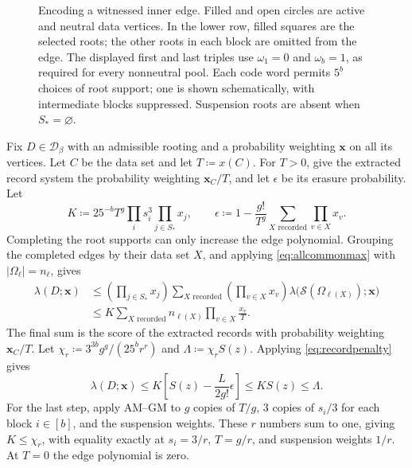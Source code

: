 \documentclass[10pt]{article}
\numberwithin{equation}{section}
\theoremstyle{definition}
\newcommand{\cD}{\mathcal D}\newcommand{\cE}{\mathcal E}\newcommand{\cF}{\mathcal F}
\newcommand{\x}{\boldsymbol{x}}\newcommand{\y}{\boldsymbol{y}}
\begin{document}
\begin{figure}[htbp]
\caption{Encoding a witnessed inner edge. Filled and open circles are active and neutral data vertices. In the lower row, filled squares are the selected roots; the other roots in each block are omitted from the edge. The displayed first and last triples use $\omega_1=0$ and $\omega_b=1$, as required for every nonneutral pool. Each code word permits $5^b$ choices of root support; one is shown schematically, with intermediate blocks suppressed. Suspension roots are absent when $S_*=\varnothing$.}
\label{fig:recordedge}
\end{figure}

Fix $D\in\cD_\beta$ with an admissible rooting and a probability weighting $\x$ on all its vertices. Let $C$ be the data set and let $T\coloneqq x(C)$. For $T>0$, give the extracted record system the probability weighting $\x_C/T$, and let $\epsilon$ be its erasure probability. Let
\[
 K\coloneqq25^{-b}T^g\prod_i s_i^3\prod_{j\in S_*}x_j,
 \qquad \epsilon\coloneqq1-\frac{g!}{T^g}
             \sum_{X\text{ recorded}}\prod_{v\in X}x_v.
\]
Completing the root supports can only increase the edge polynomial. Grouping the completed edges by their data set $X$, and applying \eqref{eq:allcommonmax} with $|\Omega_\ell|=n_\ell$, gives
\[
 \begin{aligned}
 \lambda(D;\x)
 &\le\left(\prod_{j\in S_*}x_j\right)
       \sum_{X\text{ recorded}}\left(\prod_{v\in X}x_v\right)
       \lambda\bigl(\mathcal S(\Omega_{\ell(X)});\x\bigr)\\
 &\le K\sum_{X\text{ recorded}}n_{\ell(X)}
                         \prod_{v\in X}\frac{x_v}{T}.
 \end{aligned}
\]
The final sum is the score of the extracted records with probability weighting $\x_C/T$. Let $\chi_r\coloneqq3^{3b}g^g/(25^b r^r)$ and $\Lambda\coloneqq\chi_rS(z)$. Applying \eqref{eq:recordpenalty} gives
\begin{equation}\label{eq:defectglobal}
 \lambda(D;\x)\le K\left[S(z)-\frac L{2g!}\epsilon\right]
 \le KS(z)\le\Lambda.
\end{equation}
For the last step, apply AM--GM to $g$ copies of $T/g$, 3 copies of $s_i/3$ for each block $i\in[b]$, and the suspension weights. These $r$ numbers sum to one, giving $K\le\chi_r$, with equality exactly at $s_i=3/r$, $T=g/r$, and suspension weights $1/r$. At $T=0$ the edge polynomial is zero.
\end{document}
